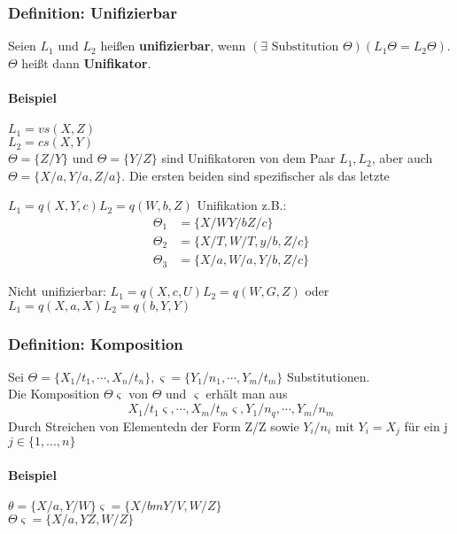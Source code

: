 \documentclass[12pt, a4paper]{article}
\begin{document}
\subsubsection{Definition: Unifizierbar}

Seien $L_1$ und $L_2$ heißen \textbf{unifizierbar}, wenn $(\exists \text{ Substitution } \Theta)(L_1\Theta = L_2\Theta)$. $\Theta$ heißt dann \textbf{Unifikator}.

\paragraph{Beispiel}

$L_1 = vs(X, Z)$ \\
$L_2 = cs(X, Y)$ \\
$\Theta = \{ Z / Y \}$ und $\Theta = \{ Y / Z \}$ sind Unifikatoren von dem Paar $L_1, L_2$, aber auch $\Theta = \{ X/a, Y/a, Z/a \}$. Die ersten beiden sind spezifischer als das letzte

$L_1 = q(X, Y ,c) L_2 = q(W, b, Z)$
Unifikation z.B.:
\begin{equation}
\begin{split}
\Theta_1 &= \{ X/W Y/b Z/c \} \\
\Theta_2 &= \{ X/T, W/T, y/b, Z/c \} \\
\Theta_3 &= \{ X/a, W/a, Y/b, Z/c\}
\end{split}
\end{equation}

Nicht unifizierbar:
$L_1 = q(X, c, U) L_2 = q(W, G, Z)$ oder $L_1 = q(X, a, X) L_2 = q(b, Y, Y)$

\subsubsection{Definition: Komposition}

Sei $\Theta = \{ X_1 / t_1, \cdots, X_n / t_n \}, \varsigma = \{ Y_1 / n_1, \cdots, Y_m / t_m \}$ Substitutionen. \\
Die Komposition $\Theta\varsigma$ von $\Theta$ und $\varsigma$ erhält man aus 
\begin{equation}
X_1 / t_1\varsigma, \cdots, X_m / t_m\varsigma, Y_1 / n_q, \cdots, Y_m / n_m
\end{equation}
Durch Streichen von Elementedn der Form Z/Z sowie $Y_i / n_i$ mit $Y_i = X_j$ für ein j$j \in \{1, ..., n\}$

\paragraph{Beispiel} $\theta= \{ X/a,  Y/W \} \varsigma=\{X/ bm Y/ V, W/Z \}$ \\
$\Theta\varsigma = \{ X/a, YZ, W/Z \}$
\end{document}
